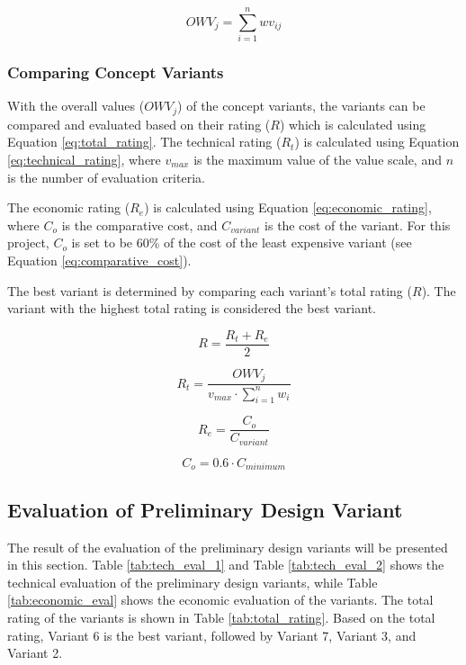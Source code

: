 \begin{equation}
    OWV_{j}=\sum_{i=1}^{n}wv_{ij}
    \label{eq:weighted_sum}
\end{equation}

\subsubsection{Comparing Concept Variants}
With the overall values ($OWV_{j}$) of the concept variants, the variants can be compared and evaluated based on their rating ($R$) which is calculated using Equation \ref{eq:total_rating}. The technical rating ($R_{t}$) is calculated using Equation \ref{eq:technical_rating}, where $v_{max}$ is the maximum value of the value scale, and $n$ is the number of evaluation criteria.

The economic rating ($R_{e}$) is calculated using Equation \ref{eq:economic_rating}, where $C_{o}$ is the comparative cost, and $C_{variant}$ is the cost of the variant. For this project, $C_{o}$ is set to be 60\% of the cost of the least expensive variant (see Equation \ref{eq:comparative_cost}).

The best variant is determined by comparing each variant's total rating ($R$). The variant with the highest total rating is considered the best variant.


\begin{equation}
    R=\frac{R_{t}+R_{e}}{2}
    \label{eq:total_rating}
\end{equation}

\begin{equation}
    R_t=\frac{OWV_{j}}{v_{max}\cdot\sum_{i=1}^{n}w_{i}}
    \label{eq:technical_rating}
\end{equation}

\begin{equation}
    R_e=\frac{C_{o}}{C_{variant}}
    \label{eq:economic_rating}
\end{equation}

\begin{equation}
    C_{o}=0.6\cdot C_{minimum}
    \label{eq:comparative_cost}
\end{equation}

\subsection{Evaluation of Preliminary Design Variant}
The result of the evaluation of the preliminary design variants will be presented in this section. Table \ref{tab:tech_eval_1} and  Table \ref{tab:tech_eval_2} shows the technical evaluation of the preliminary design variants, while Table \ref{tab:economic_eval} shows the economic evaluation of the variants. The total rating of the variants is shown in Table \ref{tab:total_rating}. Based on the total rating, Variant 6 is the best variant, followed by Variant 7, Variant 3, and Variant 2.

